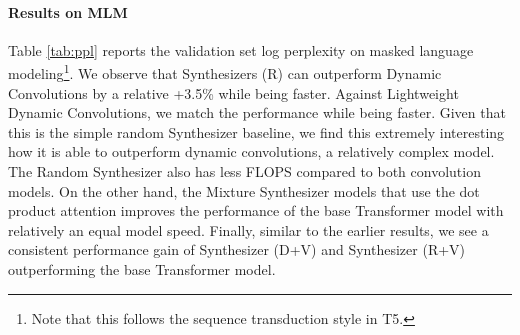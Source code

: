 \documentclass{article}
\begin{document}
\paragraph{Results on MLM} Table \ref{tab:ppl} reports the validation set log perplexity on masked language modeling\footnote{Note that this follows the sequence transduction style in T5.}. We observe that Synthesizers (R) can outperform Dynamic Convolutions by a relative +3.5\% while being  faster. Against Lightweight Dynamic Convolutions, we match the performance while being  faster. Given that this is the simple random Synthesizer baseline, we find this extremely interesting how it is able to outperform dynamic convolutions, a relatively complex model. The Random Synthesizer also has less FLOPS compared to both convolution models. On the other hand, the Mixture Synthesizer models that use the dot product attention improves the performance of the base Transformer model with relatively an equal model speed. Finally, similar to the earlier results, we see a consistent performance gain of Synthesizer (D+V) and Synthesizer (R+V) outperforming the base Transformer model.
\end{document}
